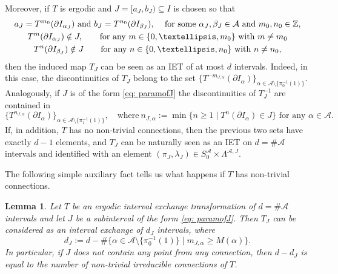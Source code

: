 \documentclass[10pt,a4paper]{amsart}
\theoremstyle{plain}
\newtheorem{lemma}[theorem]{Lemma}
\theoremstyle{definition}
\newcommand{\A}{\mathcal{A}}
\newcommand{\Z}{\mathbb{Z}}
\begin{document}
Moreover, if $T$ is ergodic and $J=[a_J,b_J)\subseteq I$ is chosen so that
\begin{equation}\label{eq: paramofJ}
\begin{gathered}
\text{$a_J=T^{m_0}(\partial I_{\alpha_J})$ and $b_J=T^{n_0}(\partial I_{\beta_J})$, \quad for some $\alpha_J,\beta_J\in\mathcal A$ and $m_0,n_0\in\Z$,} \\
T^{m}(\partial I_{\alpha_J})\notin J, \qquad \text{for any } m \in \{0, \ldots, m_0\} \text{ with } m \neq m_0 \\
T^n(\partial I_{\beta_J})\notin J \qquad \text{for any } n \in \{0, \ldots, n_0\} \text{ with } n \neq n_0,
\end{gathered}
\end{equation}
then the induced map $T_J$ can be seen as an IET of at most $d$ intervals. Indeed, in this case, the discontinuities of $T_J$ belong to the set $
\{T^{-m_{J,\alpha}}(\partial I_{\alpha})\}_{\alpha\in \A\setminus \{\pi_0^{-1}(1)\}}$. Analogously, if $J$ is of the form \eqref{eq: paramofJ} the discontinuities of $T_J^{-1}$ are contained in
\[
\{T^{n_{J,\alpha}}(\partial I_{\alpha})\}_{\alpha\in \A\setminus \{\pi_1^{-1}(1)\}},\!\quad \text{where}\ n_{J,\alpha}:=\min\{n\geq 1\mid T^{n}(\partial I_{\alpha})\in J\} \text{ for any } \alpha \in \A.
\]
If, in addition, $T$ has no non-trivial connections, then the previous two sets have exactly $d - 1$ elements, and $T_J$ can be naturally seen as an IET on $d=\#\A$ intervals and identified with an element $(\pi_J, \lambda_J) \in S_0^\A \times \Lambda^{\A, J}$.

The following simple auxiliary fact tells us what happens if $T$ has non-trivial
connections.

\begin{lemma}\label{lem: alphabetafetrconnections}
Let $T$ be an ergodic interval exchange transformation of $d=\#\A$ intervals and let $J$ be a subinterval of the form \eqref{eq: paramofJ}. Then $T_J$ can be considered as an interval exchange of $d_J$ intervals, where
\[
d_J:= d - \#\{\alpha\in\A\setminus \{\pi_0^{-1}(1)\} \mid m_{J,\alpha}\ge M(\alpha)\}.
\]
In particular, if $J$ does not contain any point from any connection, then $d-d_J$ is equal to the number of non-trivial irreducible connections of $T$.
\end{lemma}
\end{document}
